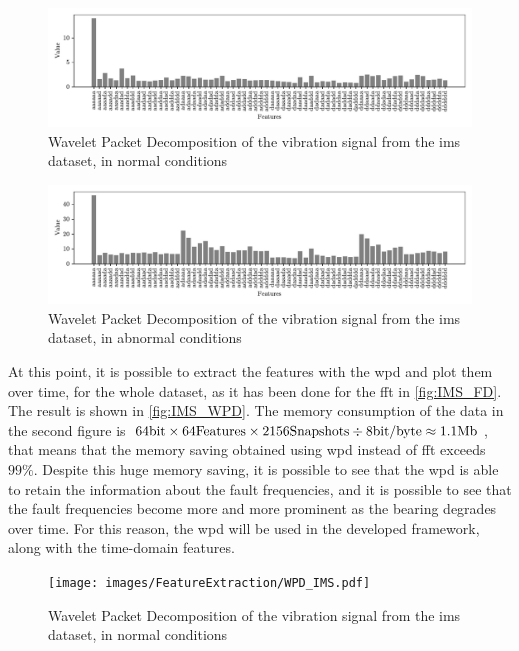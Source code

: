 \begin{figure}
    \centering
    \includegraphics[width=\textwidth]{images/FeatureExtraction/IMS_WPD_health.pdf}
    \caption{Wavelet Packet Decomposition of the  vibration signal from the \gls{ims} dataset, in normal conditions}
    \label{fig:IMS_WPD_health}
\end{figure}

\begin{figure}
    \centering
    \includegraphics[width=\textwidth]{images/FeatureExtraction/IMS_WPD_fault.pdf}
    \caption{Wavelet Packet Decomposition of the  vibration signal from the \gls{ims} dataset, in abnormal conditions}
    \label{fig:IMS_WPD_fault}
\end{figure}

At this point, it is possible to extract the features with the \gls{wpd} and plot them over time, for the whole dataset, as it has been done for the \gls{fft} in \autoref{fig:IMS_FD}. The result is shown in \autoref{fig:IMS_WPD}. The memory consumption of the data in the second figure is $64 \si{\bit} \times 64 \text{Features} \times 2156 \text{Snapshots} \div 8 \text{bit/byte} \approx 1.1 \text{Mb}$, that means that the memory saving obtained using \gls{wpd} instead of \gls{fft} exceeds $99\%$. 
Despite this huge memory saving, it is possible to see that the \gls{wpd} is able to retain the information about the fault frequencies, and it is possible to see that the fault frequencies become more and more prominent as the bearing degrades over time. For this reason, the \gls{wpd} will be used in the developed framework, along with the time-domain features.

\begin{figure}
    \centering
    \texttt{[image: images/FeatureExtraction/WPD\_IMS.pdf]}
    \caption{Wavelet Packet Decomposition of the  vibration signal from the \gls{ims} dataset, in normal conditions}
    \label{fig:IMS_WPD}
\end{figure}

